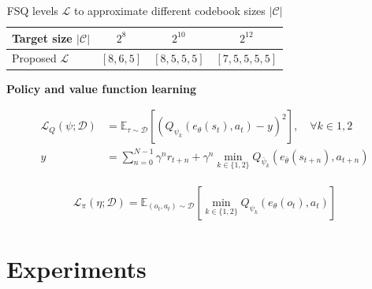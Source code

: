 \documentclass{article}
\theoremstyle{plain}
\theoremstyle{definition}
\theoremstyle{remark}
\newcommand{\our}{\textsc{iFSQ-RL}\xspace}
\newcommand{\E}{\mathbb{E}}
\begin{document}
\begin{table}[t]
\caption{FSQ levels $\mathcal{L}$ to approximate different codebook sizes $|\mathcal{C}|$}
\label{sample-table}
\vskip 0.15in
\begin{center}
\begin{small}
\begin{sc}
\begin{tabular}{lccc}
\toprule
Target size $|\mathcal{C}|$ & $2^{8}$ & $2^{10}$ & $2^{12}$ \\
\midrule
Proposed $\mathcal{L}$ & $[8,6,5]$ & $[8,5,5,5]$ & $[7,5,5,5,5]$ \\
\end{tabular}
\end{sc}
\end{small}
\end{center}
\vskip -0.1in
\end{table}



\textbf{Policy and value function learning}

\begin{align} \label{eq:value-loss}
  \mathcal{L}_{Q}(\psi ; \mathcal{D}) &= \E_{\tau \sim \mathcal{D}} \left[ (Q_{\psi_{k}}(e_{\theta}(s_{t}), a_{t}) - y)^{2}  \right], \quad \forall k \in 1, 2 \\
  y &= \sum_{n=0}^{N-1} \gamma^{n} r_{t+n} + \gamma^{n} \min_{k \in \{1,2\}} Q_{\bar{\psi}_{k}}(e_{\bar{\theta}}(s_{t+n}), a_{t+n})
\end{align}


\begin{align} \label{eq:policy-loss}
 \mathcal{L}_{\pi}(\eta; \mathcal{D}) = \E_{(o_{t}, a_{t}) \sim \mathcal{D}} \left[ \min_{k\in\{1,2\}} Q_{\psi_{k}}(e_{\theta}(o_{t}), a_{t}) \right]
\end{align}

\section{Experiments}
\label{sec:experiments}

\end{document}
